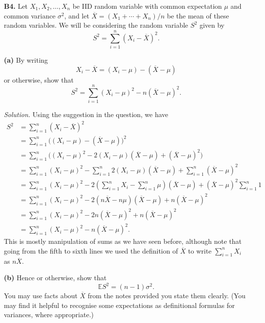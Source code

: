 \documentclass[
  a4paper,
]{book}
\theoremstyle{definition}
\theoremstyle{definition}
\theoremstyle{definition}
\theoremstyle{definition}
\theoremstyle{remark}
\begin{document}
\textbf{B4.} Let \(X_1, X_2, \dots, X_n\) be IID random variable with common expectation \(\mu\) and common variance \(\sigma^2\), and let \(\overline X = (X_1 + \cdots + X_n)/n\) be the mean of these random variables. We will be considering the random variable \(S^2\) given by
\[ S^2 = \sum_{i=1}^n (X_i - \overline X)^2 . \]

\textbf{(a)} By writing
\[ X_i - \overline X = (X_i - \mu) - (\overline X - \mu)  \]
or otherwise, show that
\[ S^2 = \sum_{i=1}^n (X_i - \mu)^2 - n(\overline X - \mu)^2 . \]

\begin{myanswers}
\emph{Solution.}
Using the suggestion in the question, we have
\begin{align*}
S^2 &= \sum_{i=1}^n (X_i - \overline X)^2 \\
  &= \sum_{i=1}^n \big( (X_i - \mu) - (\overline X - \mu)  \big)^2 \\
  &= \sum_{i=1}^n \big( (X_i - \mu)^2 - 2(X_i - \mu)(\overline X - \mu) + (\overline X - \mu)^2\big) \\
  &= \sum_{i=1}^n (X_i - \mu)^2 - \sum_{i=1}^n 2(X_i - \mu)(\overline X - \mu) + \sum_{i=1}^n (\overline X - \mu)^2 \\
  &= \sum_{i=1}^n (X_i - \mu)^2 - 2\left(\sum_{i=1}^n X_i - \sum_{i=1}^n \mu\right)(\overline X - \mu)  + (\overline X - \mu)^2 \sum_{i=1}^n 1 \\
  &= \sum_{i=1}^n (X_i - \mu)^2 - 2(n\overline X - n\mu) (\overline X - \mu) + n (\overline X - \mu)^2 \\
  &= \sum_{i=1}^n (X_i - \mu)^2 - 2n(\overline X - \mu)^2 + n(\overline X - \mu)^2 \\
  &= \sum_{i=1}^n (X_i - \mu)^2 - n(\overline X - \mu)^2 .
\end{align*}
This is mostly manipulation of sums as we have seen before, although note that going from the fifth to sixth lines we used the definition of \(\overline X\) to write \(\sum_{i=1}^n X_i\) as \(n \overline X\).

\end{myanswers}

\textbf{(b)} Hence or otherwise, show that
\[ \mathbb E S^2 = (n - 1)\sigma^2 . \]
You may use facts about \(\overline X\) from the notes provided you state them clearly. (You may find it helpful to recognise some expectations as definitional formulas for variances, where appropriate.)
\end{document}
